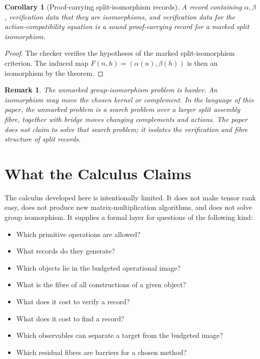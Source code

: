 \documentclass[11pt]{article}
\newtheorem{corollary}[theorem]{Corollary}
\newtheorem{remark}[theorem]{Remark}
\begin{document}
\begin{corollary}[Proof-carrying split-isomorphism records]
A record containing \(\alpha,\beta\), verification data that they are isomorphisms, and verification data for the action-compatibility equation is a sound proof-carrying record for a marked split isomorphism.
\end{corollary}

\begin{proof}
The checker verifies the hypotheses of the marked split-isomorphism criterion.  The induced map \(F(n,h)=(\alpha(n),\beta(h))\) is then an isomorphism by the theorem.
\end{proof}

\begin{remark}
The unmarked group-isomorphism problem is harder.  An isomorphism may move the chosen kernel or complement.  In the language of this paper, the unmarked problem is a search problem over a larger split assembly fibre, together with bridge moves changing complements and actions.  The paper does not claim to solve that search problem; it isolates the verification and fibre structure of split records.
\end{remark}

\section{What the Calculus Claims}

The calculus developed here is intentionally limited.  It does not make tensor rank easy, does not produce new matrix-multiplication algorithms, and does not solve group isomorphism.  It supplies a formal layer for questions of the following kind:
\begin{itemize}[leftmargin=2em]
\item Which primitive operations are allowed?
\item What records do they generate?
\item Which objects lie in the budgeted operational image?
\item What is the fibre of all constructions of a given object?
\item What does it cost to verify a record?
\item What does it cost to find a record?
\item Which observables can separate a target from the budgeted image?
\item Which residual fibres are barriers for a chosen method?
\end{itemize}
\end{document}
